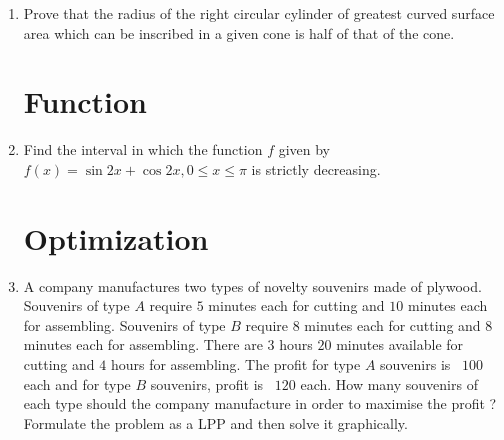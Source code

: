 \documentclass[10pt,-letter paper]{article}
\providecommand{\brak}[1]{\ensuremath{\left(#1\right)}}
\begin{document}
\begin{enumerate}
     \item Prove that the radius of the right circular cylinder of greatest curved surface area which can be inscribed in a given cone is half of that of the cone.
     
     \section{Function}
     \item Find the interval in which the function $f$ given by $f\brak{x}=\sin2x+\cos2x,0\leq{x}\leq{\pi}$ is strictly decreasing.

     \section{Optimization}
		\item A company manufactures two types of novelty souvenirs made of plywood. Souvenirs of type $A$ require $5$ minutes each for cutting and $10$ minutes each for assembling. Souvenirs of type $B$ require $8$ minutes each for cutting and $8$ minutes each for assembling. There are $3$ hours $20$ minutes available for cutting and $4$ hours for assembling. The profit for type $A$ souvenirs is \rupee~$100$ each and for type $B$ souvenirs, profit is \rupee~$120$ each. How many souvenirs of each type should the company manufacture in order to maximise the profit ? Formulate the problem as a LPP and then solve it graphically.		
\end{enumerate}
     
\end{document}
